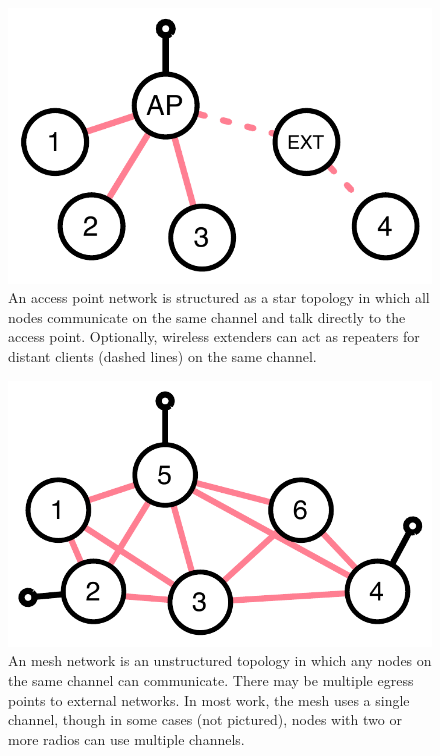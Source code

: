 \begin{figure}[p]
      \centering
      \includegraphics[width=0.8\columnwidth]{figures/omni/ap.pdf}
      \caption{\label{fig:ap_network} An access point network is structured as a star topology in which all nodes communicate on the same channel and talk directly to the access point. Optionally, wireless extenders can act as repeaters for distant clients (dashed lines) on the same channel.}
\end{figure}
\begin{figure}[p]
      \centering
      \includegraphics[width=0.8\columnwidth]{figures/omni/mesh.pdf}
      \caption{\label{fig:mesh} An mesh network is an unstructured topology in which any nodes on the same channel can communicate. There may be multiple egress points to external networks. In most work, the mesh uses a single channel, though in some cases (not pictured), nodes with two or more radios can use multiple channels.}
\end{figure}

